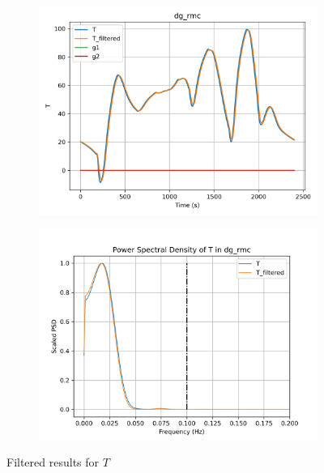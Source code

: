 \begin{figure}[H]

\begin{minipage}{0.49\textwidth}
        \begin{figure}[H]
                \centering
                \includegraphics[width = \textwidth]{./figs/tst_filt/dg_rmc/T.png}
        \end{figure}
\end{minipage}
\begin{minipage}{0.49\textwidth}
        \begin{figure}[H]
                \centering
                \includegraphics[width = \textwidth]{./figs/tst_filt/dg_rmc/T_psd.png}
        \end{figure}
\end{minipage}
\caption{Filtered results for $T$}

\end{figure}


